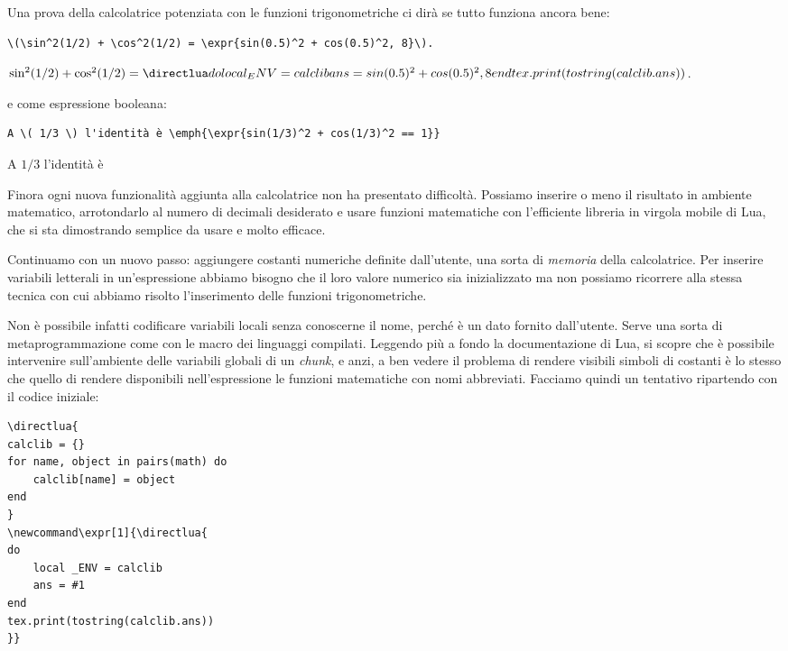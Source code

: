 Una prova della calcolatrice potenziata con le funzioni trigonometriche ci dirà
se tutto funziona ancora bene:
\begin{tcolorbox}
\begin{Verbatim}[numbers=none,xleftmargin=0pt]
\(\sin^2(1/2) + \cos^2(1/2) = \expr{sin(0.5)^2 + cos(0.5)^2, 8}\).
\end{Verbatim}
\tcblower
\(\sin^2(1/2) + \cos^2(1/2) = \expr{sin(0.5)^2 + cos(0.5)^2, 8}\).
\end{tcolorbox}
e come espressione booleana:
\begin{tcolorbox}
\begin{Verbatim}[numbers=none,xleftmargin=0pt]
A \( 1/3 \) l'identità è \emph{\expr{sin(1/3)^2 + cos(1/3)^2 == 1}}
\end{Verbatim}
\tcblower
A \( 1/3 \) l'identità è \emph{}
\end{tcolorbox}

Finora ogni nuova funzionalità aggiunta alla calcolatrice non ha presentato
difficoltà. Possiamo inserire o meno il risultato in ambiente matematico,
arrotondarlo al numero di decimali desiderato e usare funzioni matematiche con
l'efficiente libreria in virgola mobile di Lua, che si sta dimostrando semplice
da usare e molto efficace.

Continuamo con un nuovo passo: aggiungere costanti numeriche definite
dall'utente, una sorta di \emph{memoria} della calcolatrice. Per inserire
variabili letterali in un'espressione abbiamo bisogno che il loro valore
numerico sia inizializzato ma non possiamo ricorrere alla stessa tecnica con cui
abbiamo risolto l'inserimento delle funzioni trigonometriche.

Non è possibile infatti codificare variabili locali senza conoscerne il nome,
perché è un dato fornito dall'utente. Serve una sorta di metaprogrammazione come
con le macro dei linguaggi compilati. Leggendo più a fondo la documentazione di
Lua, si scopre che è possibile intervenire sull'ambiente delle variabili globali
 di un \emph{chunk}, e anzi, a ben vedere il problema di rendere
visibili simboli di costanti è lo stesso che quello di rendere disponibili
nell'espressione le funzioni matematiche con nomi abbreviati. Facciamo quindi un
tentativo ripartendo con il codice iniziale:
\begin{Verbatim}
\directlua{
calclib = {}
for name, object in pairs(math) do
    calclib[name] = object
end
}
\newcommand\expr[1]{\directlua{
do
    local _ENV = calclib
    ans = #1
end
tex.print(tostring(calclib.ans))
}}
\end{Verbatim}

